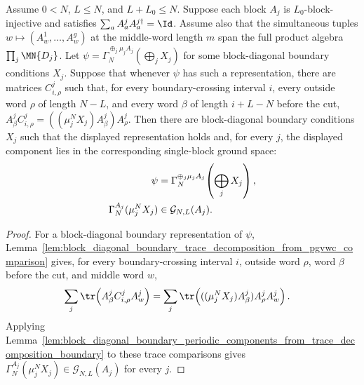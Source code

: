 \begin{lemma}
    \label{lem:block_diagonal_boundary_periodic_components_from_pgvwc_comparison_boundary}
    \leanok
    Assume $0<N$, $L\le N$, and $L+L_0\le N$. Suppose each block $A_j$
    is $L_0$-block-injective and satisfies
    $\sum_a A^j_aA^{j\dagger}_a=\Id$. Assume also that the simultaneous tuples
    $w\mapsto(A^1_w,\ldots,A^g_w)$ at the middle-word length $m$ span the full
    product algebra $\prod_j\MN{D_j}$. Let
    $\psi=\Gamma_N^{\oplus_j\mu_jA_j}(\bigoplus_jX_j)$ for some block-diagonal
    boundary conditions $X_j$. Suppose that whenever $\psi$ has such a
    representation, there are matrices $C^j_{i,\rho}$ such that, for every
    boundary-crossing interval $i$, every outside word $\rho$ of length $N-L$,
    and every word $\beta$ of length $i+L-N$ before the cut,
    $A^j_\beta C^j_{i,\rho} = ((\mu_j^NX_j)A^j_\beta)A^j_\rho$.
    Then there are block-diagonal boundary conditions $X_j$ such that the displayed
    representation holds and, for every $j$, the displayed component lies in
    the corresponding single-block ground space:
    \begin{align}
        \psi
         & =
        \Gamma_N^{\oplus_j\mu_jA_j}\!\left(\bigoplus_jX_j\right),
        \notag                       \\
        \Gamma_N^{A_j}(\mu_j^NX_j)
         & \in\mathcal G_{N,L}(A_j).
        \notag
    \end{align}
\end{lemma}

\begin{proof}
    \leanok
    For a block-diagonal boundary representation of $\psi$,
    Lemma~\ref{lem:block_diagonal_boundary_trace_decomposition_from_pgvwc_comparison}
    gives, for every boundary-crossing interval $i$, outside word $\rho$,
    word $\beta$ before the cut, and middle word $w$,
    \begin{align}
        \sum_j\tr\!\left(A^j_\beta C^j_{i,\rho}A^j_w\right)
         & =
        \sum_j\tr\!\left(((\mu_j^NX_j)A^j_\beta)A^j_\rho A^j_w\right).
        \notag
    \end{align}
    Applying
    Lemma~\ref{lem:block_diagonal_boundary_periodic_components_from_trace_decomposition_boundary}
    to these trace comparisons gives
    $\Gamma_N^{A_j}(\mu_j^NX_j)\in\mathcal G_{N,L}(A_j)$ for every $j$.
\end{proof}

